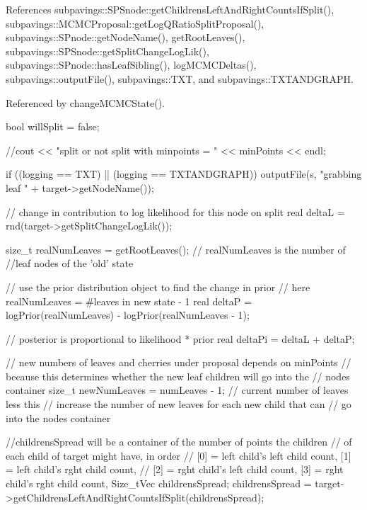 \-References subpavings\-::\-S\-P\-Snode\-::get\-Childrens\-Left\-And\-Right\-Counts\-If\-Split(), subpavings\-::\-M\-C\-M\-C\-Proposal\-::get\-Log\-Q\-Ratio\-Split\-Proposal(), subpavings\-::\-S\-Pnode\-::get\-Node\-Name(), get\-Root\-Leaves(), subpavings\-::\-S\-P\-Snode\-::get\-Split\-Change\-Log\-Lik(), subpavings\-::\-S\-Pnode\-::has\-Leaf\-Sibling(), log\-M\-C\-M\-C\-Deltas(), subpavings\-::output\-File(), subpavings\-::\-T\-X\-T, and subpavings\-::\-T\-X\-T\-A\-N\-D\-G\-R\-A\-P\-H.



\-Referenced by change\-M\-C\-M\-C\-State().


\begin{DoxyCode}
{
    bool willSplit = false;

  //cout << "split or not split with minpoints = " << minPoints << endl;
  
    if ((logging == TXT) || (logging == TXTANDGRAPH))
        outputFile(s, "grabbing leaf " + target->getNodeName());

    // change in contribution to log likelihood for this node on split
    real deltaL = rnd(target->getSplitChangeLogLik());

    size_t realNumLeaves = getRootLeaves(); // realNumLeaves is the number of 
                            //leaf nodes of the 'old' state

    // use the prior distribution object to find the change in prior
    // here realNumLeaves = #leaves in new state - 1 
    real deltaP = logPrior(realNumLeaves) - logPrior(realNumLeaves - 1);

    // posterior is proportional to likelihood * prior
    real deltaPi = deltaL + deltaP;

    // new numbers of leaves and cherries under proposal depends on minPoints
    // because this determines whether the new leaf children will go into the
    // nodes container
    size_t newNumLeaves = numLeaves - 1; // current number of leaves less this
    // increase the number of new leaves for each new child that can
    // go into the nodes container

    //childrensSpread will be a container of the number of points the children
    // of each child of target might have, in order
    // [0] = left child's left child count, [1] = left child's rght child
       count,
    // [2] = rght child's left child count, [3] = rght child's rght child
       count,
    Size_tVec childrensSpread;
    childrensSpread =
                target->getChildrensLeftAndRightCountsIfSplit(childrensSpread);

}
\end{DoxyCode}
